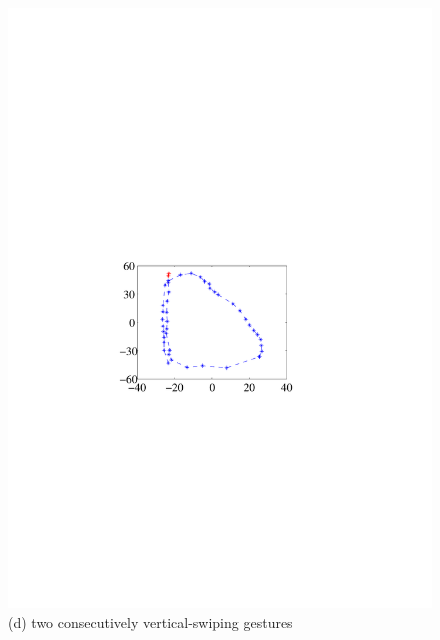 \begin{figure}[!t]
{\begin{minipage}[t]{0.19\textwidth}
            \includegraphics[width=\textwidth]{fig/gesture-distinction4.pdf}\\
            \centering \footnotesize (d) two consecutively vertical-swiping gestures
            \end{minipage}
        }
\end{figure}
